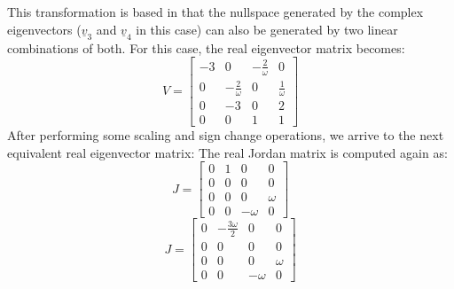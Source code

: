 			\indent This transformation is based in that the nullspace generated by the complex eigenvectors ($\underline{v}_3$ and $\underline{v}_4$ in this case) can also be generated by two linear combinations of both. For this case, the real eigenvector matrix becomes:
			\begin{equation}
			V = \left[ \begin{array}{cccc}
			-3 	& 0					& -\frac{2}{\omega}	& 0	\\
			0 	& -\frac{2}{\omega}	& 0  				& \frac{1}{\omega} 	\\
			0 	& -3				& 0					& 2				\\
			0 	& 0					& 1 				& 1
			\end{array}\right]
			\label{eqCh2:V_real}
			\end{equation}
			\indent After performing some scaling and sign change operations, we arrive to the next equivalent real eigenvector matrix:
			\indent The real Jordan matrix is computed again as:
			\begin{equation}
			J = \left[ \begin{array}{cccc}
			0 	& 1	& 0		& 0			\\
			0 	& 0						& 0  	& 0 		\\
			0 	& 0						& 0		& \omega	\\
			0 	& 0						& -\omega 	& 0
			\end{array}\right]
			\label{eqCh2:J_real}
			\end{equation}
			\begin{equation}
			J = \left[ \begin{array}{cccc}
			0 	& -\frac{3\omega}{2}	& 0		& 0			\\
			0 	& 0						& 0  	& 0 		\\
			0 	& 0						& 0		& \omega	\\
			0 	& 0						& -\omega 	& 0
			\end{array}\right]
			\label{eqCh2:J_real}
			\end{equation}
